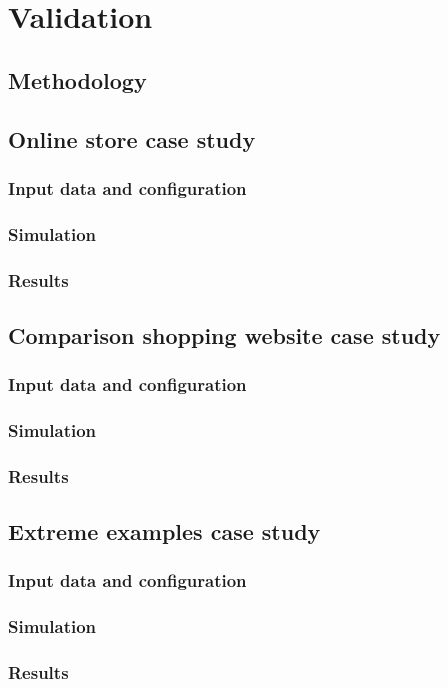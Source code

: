 \chapter{Validation} \label{chap:validation}

\section*{}

\section{Methodology}

\section{Online store case study}

\subsection{Input data and configuration}
\subsection{Simulation}
\subsection{Results}

\section{Comparison shopping website case study}

\subsection{Input data and configuration}
\subsection{Simulation}
\subsection{Results}

\section{Extreme examples case study}

\subsection{Input data and configuration}
\subsection{Simulation}
\subsection{Results}
